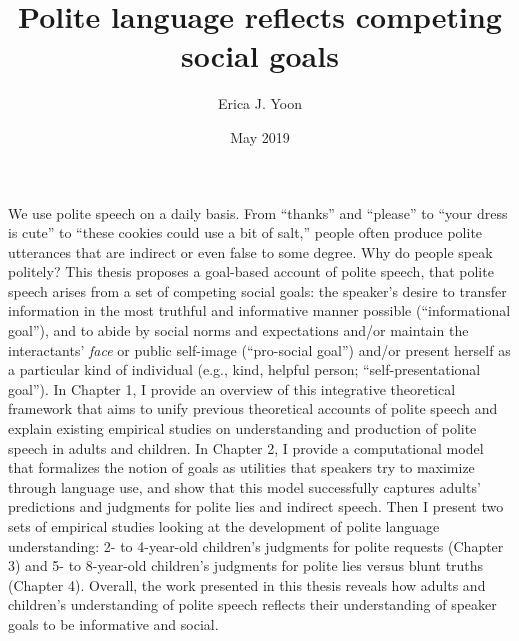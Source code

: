 \documentclass[oneside]{report}
\begin{document}
\title{Polite language reflects competing social goals}
\author{Erica J. Yoon}
\date{May 2019}


\makeatletter
\def\maxwidth{ %
  \ifdim\Gin@nat@width>\linewidth
    \linewidth
  \else
    \Gin@nat@width
  \fi
}
\makeatother

\renewcommand{\contentsname}{Contents}

\setlength{\parskip}{0pt}


\providecommand{\tightlist}{%
  \setlength{\itemsep}{0pt}\setlength{\parskip}{0pt}}




\beforepreface
{}
We use polite speech on a daily basis. From ``thanks'' and ``please'' to
``your dress is cute'' to ``these cookies could use a bit of salt,''
people often produce polite utterances that are indirect or even false
to some degree. Why do people speak politely? This thesis proposes a
goal-based account of polite speech, that polite speech arises from a
set of competing social goals: the speaker's desire to transfer
information in the most truthful and informative manner possible
(``informational goal''), and to abide by social norms and expectations
and/or maintain the interactants' \emph{face} or public self-image
(``pro-social goal'') and/or present herself as a particular kind of
individual (e.g., kind, helpful person; ``self-presentational goal'').
In Chapter 1, I provide an overview of this integrative theoretical
framework that aims to unify previous theoretical accounts of polite
speech and explain existing empirical studies on understanding and
production of polite speech in adults and children. In Chapter 2, I
provide a computational model that formalizes the notion of goals as
utilities that speakers try to maximize through language use, and show
that this model successfully captures adults' predictions and judgments
for polite lies and indirect speech. Then I present two sets of
empirical studies looking at the development of polite language
understanding: 2- to 4-year-old children's judgments for polite requests
(Chapter 3) and 5- to 8-year-old children's judgments for polite lies
versus blunt truths (Chapter 4). Overall, the work presented in this
thesis reveals how adults and children's understanding of polite speech
reflects their understanding of speaker goals to be informative and
social.
\end{document}
